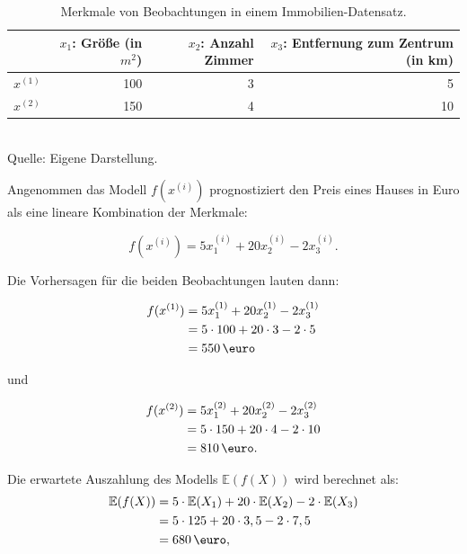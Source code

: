 \begin{table}[h]
    \caption{Merkmale von Beobachtungen in einem Immobilien-Datensatz.}
    \footnotesize
    \begin{tabularx}{\textwidth}{Xrrr}
    \toprule
     & $x_1$: Größe (in $m^2$) &  $x_2$: Anzahl Zimmer &  $x_3$: Entfernung zum Zentrum (in km) \\
    \midrule
    $x^{(1)}$ & 100 & 3 & 5 \\
    $x^{(2)}$ & 150 & 4 & 10 \\
    \bottomrule
    \end{tabularx}
    \label{tab:example}
    \normalsize\\
    Quelle: Eigene Darstellung.
\end{table}

Angenommen das Modell $f(x^{(i)})$ prognostiziert den Preis eines Hauses in Euro als eine lineare Kombination der Merkmale:

\begin{equation}
    f(x^{(i)}) = 5x_1^{(i)} + 20x_2^{(i)} - 2x_3^{(i)}.
\end{equation}

Die Vorhersagen für die beiden Beobachtungen lauten dann:

\begin{align}
    \label{eq:fx1}
    f(x^{(1)}) &= 5x_1^{(1)} + 20x_2^{(1)} - 2x_3^{(1)} \\ \notag
        &= 5 \cdot 100 + 20 \cdot 3 - 2 \cdot 5 \\ \notag
        &= 550\,\text{\euro} 
\end{align}

und 

\begin{align}
    f(x^{(2)}) &= 5x_1^{(2)} + 20x_2^{(2)} - 2x_3^{(2)} \\ \notag
        &= 5 \cdot 150 + 20 \cdot 4 - 2 \cdot 10 \\ \notag
        &= 810\,\text{\euro}. 
\end{align}

Die erwartete Auszahlung des Modells $\mathbb{E}(f(X))$ wird berechnet als:
\begin{align}
    \label{eq:efx}
    \mathbb{E}(f(X)) &= 5 \cdot \mathbb{E}(X_1) + 20 \cdot \mathbb{E}(X_2) - 2 \cdot \mathbb{E}(X_3) \\ \notag
                     &= 5 \cdot 125 + 20 \cdot 3,5 - 2 \cdot 7,5 \\ \notag
                     &= 680 \,\text{\euro},
\end{align}

